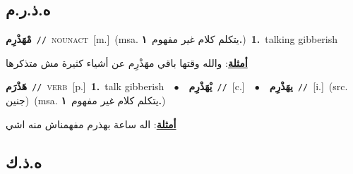\documentclass[10pt,a4paper,twoside]{article} %
\begin{document}
\begin{multicols}{2}
\vspace{-3mm}
\subsection*{\color{blue}\foreignlanguage{arabic}{ه.ذ.ر.م}\color{blue}{}} 

{\setlength\topsep{0pt}\textbf{\foreignlanguage{arabic}{مْهَذْرِم}}\ {\color{gray}\texttt{//}\color{black}}\ \textsc{noun\textunderscore act}\ [m.]\ \color{gray}(msa. \foreignlanguage{arabic}{يتكلم كلام غير مفهوم}~\foreignlanguage{arabic}{\textbf{١.}})\color{black}\ \textbf{1.}~talking gibberish\  \begin{flushright}\color{gray}\foreignlanguage{arabic}{\textbf{\underline{\foreignlanguage{arabic}{أمثلة}}}: والله وقتها باقي مهَذْرِم  عن أشياء كثيرة مش متذكرها}\end{flushright}\color{black}} \vspace{2mm}

{\setlength\topsep{0pt}\textbf{\foreignlanguage{arabic}{هَذْرَم}}\ {\color{gray}\texttt{//}\color{black}}\ \textsc{verb}\ [p.]\ \textbf{1.}~talk gibberish\ \ $\bullet$\ \ \setlength\topsep{0pt}\textbf{\foreignlanguage{arabic}{يْهَذْرِم}}\ {\color{gray}\texttt{//}\color{black}}\ [c.]\ \ $\bullet$\ \ \setlength\topsep{0pt}\textbf{\foreignlanguage{arabic}{يهَذْرِم}}\ {\color{gray}\texttt{//}\color{black}}\ [i.]\ (src. \color{gray}\foreignlanguage{arabic}{جنين}\color{black})\ \color{gray}(msa. \foreignlanguage{arabic}{يتكلم كلام غير مفهوم}~\foreignlanguage{arabic}{\textbf{١.}})\color{black}\  \begin{flushright}\color{gray}\foreignlanguage{arabic}{\textbf{\underline{\foreignlanguage{arabic}{أمثلة}}}: اله ساعة بهذرم مفهمناش منه اشي}\end{flushright}\color{black}} \vspace{2mm}

\vspace{-3mm}
\subsection*{\color{blue}\foreignlanguage{arabic}{ه.ذ.ك}\color{blue}{ (ntws)}} 


\end{multicols}
\end{document}
